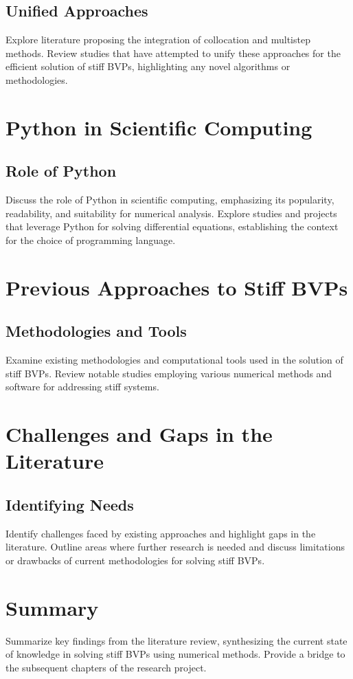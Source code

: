 \documentclass{report}
\begin{document}
\subsection{Unified Approaches}

Explore literature proposing the integration of collocation and multistep methods. Review studies that have attempted to unify these approaches for the efficient solution of stiff BVPs, highlighting any novel algorithms or methodologies.

\section{Python in Scientific Computing}

\subsection{Role of Python}

Discuss the role of Python in scientific computing, emphasizing its popularity, readability, and suitability for numerical analysis. Explore studies and projects that leverage Python for solving differential equations, establishing the context for the choice of programming language.

\section{Previous Approaches to Stiff BVPs}

\subsection{Methodologies and Tools}

Examine existing methodologies and computational tools used in the solution of stiff BVPs. Review notable studies employing various numerical methods and software for addressing stiff systems.

\section{Challenges and Gaps in the Literature}

\subsection{Identifying Needs}

Identify challenges faced by existing approaches and highlight gaps in the literature. Outline areas where further research is needed and discuss limitations or drawbacks of current methodologies for solving stiff BVPs.

\section{Summary}

Summarize key findings from the literature review, synthesizing the current state of knowledge in solving stiff BVPs using numerical methods. Provide a bridge to the subsequent chapters of the research project.




\end{document}
